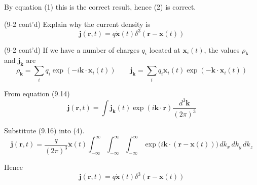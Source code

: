 \documentclass[12pt]{article}
\begin{document}
By equation (1) this is the correct result,
hence (2) is correct.

\bigskip
(9-2 cont'd)
Explain why the current density is
\begin{equation*}
\mathbf j(\mathbf r,t)=q\dot{\mathbf x}(t)\delta^3(\mathbf r-\mathbf x(t))
\end{equation*}

(9-2 cont'd)
If we have a number of charges $q_i$ located at $\mathbf x_i(t)$,
the values $\rho_{\mathbf k}$ and $\mathbf j_{\mathbf k}$ are
\begin{equation*}
\rho_{\mathbf k}=\sum_iq_i\exp(-i\mathbf k\cdot\mathbf x_i(t))
\qquad
\mathbf j_{\mathbf k}
=\sum_iq_i\dot{\mathbf x}_i(t)
\exp(-\mathbf k\cdot\mathbf x_i(t))
\tag{9.16}
\end{equation*}

From equation (9.14)
\begin{equation*}
\mathbf j(\mathbf r,t)
=\int\mathbf j_{\mathbf k}(t)
\exp(i\mathbf k\cdot\mathbf r)
\frac{d^3\mathbf k}{(2\pi)^3}
\tag{4}
\end{equation*}

Substitute (9.16) into (4).
\begin{equation*}
\mathbf j(\mathbf r,t)
=\frac{q}{(2\pi)^3}\dot{\mathbf x}(t)
\int_{-\infty}^\infty
\int_{-\infty}^\infty
\int_{-\infty}^\infty
\exp\big(i\mathbf k\cdot(\mathbf r-\mathbf x(t))\big)
\,dk_x\,dk_y\,dk_z
\end{equation*}

Hence
\begin{equation*}
\mathbf j(\mathbf r,t)=q\dot{\mathbf x}(t)\delta^3(\mathbf r-\mathbf x(t))
\end{equation*}
\end{document}
